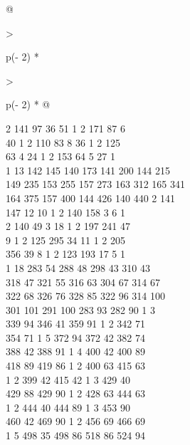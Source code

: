 \begin{question}
\begin{longtable}[]{@{}

  >{\raggedright\arraybackslash}p{(\columnwidth - 2\tabcolsep) * }

  >{\raggedright\arraybackslash}p{(\columnwidth - 2\tabcolsep) * }@{}}
\begin{minipage}[t]{\linewidth}
2 141 97 36 51 1 2 171 87 6\\

40 1 2 110 83 8 36 1 2 125\\

63 4 24 1 2 153 64 5 27 1\\

1 13 142 145 140 173 141 200 144 215\\

149 235 153 255 157 273 163 312 165 341\\

164 375 157 400 144 426 140 440 2 141\\

147 12 10 1 2 140 158 3 6 1\\

2 140 49 3 18 1 2 197 241 47\\

9 1 2 125 295 34 11 1 2 205\\

356 39 8 1 2 123 193 17 5 1\\

1 18 283 54 288 48 298 43 310 43\\

318 47 321 55 316 63 304 67 314 67\\

322 68 326 76 328 85 322 96 314 100\\

301 101 291 100 283 93 282 90 1 3\\

339 94 346 41 359 91 1 2 342 71\\

354 71 1 5 372 94 372 42 382 74\\

388 42 388 91 1 4 400 42 400 89\\

418 89 419 86 1 2 400 63 415 63\\

1 2 399 42 415 42 1 3 429 40\\

429 88 429 90 1 2 428 63 444 63\\

1 2 444 40 444 89 1 3 453 90\\

460 42 469 90 1 2 456 69 466 69\\

1 5 498 35 498 86 518 86 524 94\\


\end{minipage}
\end{longtable}
\end{question}
